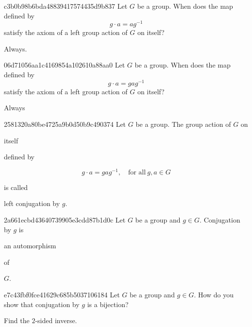 \begin{note}{c3b0b98b6bda48839417574435d9b837}
    Let \({ G }\) be a group. When does the map defined by
    \[
        g \cdot a = ag^{-1}
    \]
    satisfy the axiom of a left group action of \({ G }\) on itself?

    \begin{cloze}{1}
        Always.
    \end{cloze}
\end{note}

\begin{note}{06d71056aa1c4169854a102610a88aa0}
    Let \({ G }\) be a group. When does the map defined by
    \[
        g \cdot a = gag^{-1}
    \]
    satisfy the axiom of a left group action of \({ G }\) on itself?

    \begin{cloze}{1}
        Always
    \end{cloze}
\end{note}

\begin{note}{2581320a80be4725a9b0d50b9c490374}
    Let \({ G }\) be a group.
    The group action of \({ G }\) on \begin{icloze}{3}itself\end{icloze} defined by
    \begin{icloze}{1}
        \[
            g \cdot a = gag^{-1}, \quad \text{for all}\ g, a \in G
        \]
    \end{icloze}
    is called \begin{icloze}{2}left conjugation by \({ g }\).\end{icloze}
\end{note}

\begin{note}{2a661ecbd43640739905e3cdd87b1d0c}
    Let \({ G }\) be a group and \({ g \in G }\).
    Conjugation by \({ g }\) is \begin{icloze}{1}an automorphism\end{icloze} of \begin{icloze}{2}\({ G }\).\end{icloze}
\end{note}

\begin{note}{e7c43fbf0fce41629c685b5037106184}
    Let \({ G }\) be a group and \({ g \in G }\).
    How do you show that conjugation by \({ g }\) is a bijection?

    \begin{cloze}{1}
        Find the \({ 2 }\)-sided inverse.
    \end{cloze}
\end{note}


